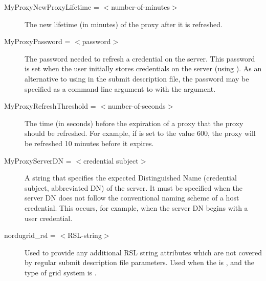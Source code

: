 \begin{description}

\label{condor-submit-MyProxyLifetime}
\item[MyProxyNewProxyLifetime = $<$number-of-minutes$>$]
The new lifetime (in minutes) of the proxy after it is refreshed.


\label{condor-submit-MyProxyPassword}
\item[MyProxyPassword = $<$password$>$]
The password needed to refresh a credential on the  server.
This password is set when the user initially stores
credentials on the server (using ).
As an alternative to using  in the
submit description file,
the password may be specified as a command line argument to 
with the  argument.


\label{condor-submit-MyProxyThreshhold}
\item[MyProxyRefreshThreshold = $<$number-of-seconds$>$]
The time (in seconds) before the expiration of a proxy 
that the proxy should be refreshed.
For example, if  is set to the
value 600, the proxy will be refreshed 10 minutes before
it expires.


\label{condor-submit-MyProxyServerDN}
\item[MyProxyServerDN = $<$credential subject$>$]
A string that specifies the expected Distinguished Name (credential subject,
abbreviated DN)
of the  server.
It must be specified when the  server
DN does not follow the
conventional naming scheme of a host credential.
This occurs, for
example, when the   server DN begins with a user credential.



\label{condor-submit-nordugrid-rsl}
\item[nordugrid\_rsl = $<$RSL-string$>$]
Used to provide any additional RSL
string attributes which are not covered by regular submit description
file parameters. Used when the  is ,
and the type of grid system is .



\end{description}
